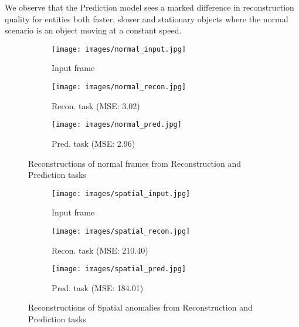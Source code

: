 \begin{itemize}
    We observe that the Prediction model sees a marked difference in reconstruction quality for entities both faster, slower and stationary objects where the normal scenario is an object moving at a constant speed. 
    \begin{figure}[h]
     \centering
     \begin{subfigure}[b]{0.3\textwidth}
         \centering
         \texttt{[image: images/normal\_input.jpg]}
         \caption{Input frame}
         \label{fig:norm-ip}
     \end{subfigure}
     \hfill
     \begin{subfigure}[b]{0.3\textwidth}
         \centering
         \texttt{[image: images/normal\_recon.jpg]}
         \caption{Recon. task (MSE: 3.02)}
         \label{fig:norm-recon}
     \end{subfigure}
     \hfill
     \begin{subfigure}[b]{0.3\textwidth}
         \centering
         \texttt{[image: images/normal\_pred.jpg]}
         \caption{Pred. task (MSE: 2.96)}
         \label{fig:norm-pred}
     \end{subfigure}
        \caption{Reconstructions of normal frames from Reconstruction and Prediction tasks}
        \label{fig:norm}
    \end{figure}
    
    \begin{figure}[h]
     \centering
     \begin{subfigure}[b]{0.3\textwidth}
         \centering
         \texttt{[image: images/spatial\_input.jpg]}
         \caption{Input frame}
         \label{fig:spat-ip}
     \end{subfigure}
     \hfill
     \begin{subfigure}[b]{0.3\textwidth}
         \centering
         \texttt{[image: images/spatial\_recon.jpg]}
         \caption{Recon. task (MSE: 210.40)}
         \label{fig:spat-recon}
     \end{subfigure}
     \hfill
     \begin{subfigure}[b]{0.3\textwidth}
         \centering
         \texttt{[image: images/spatial\_pred.jpg]}
         \caption{Pred. task (MSE: 184.01)}
         \label{fig:spat-pred}
     \end{subfigure}
        \caption{Reconstructions of Spatial anomalies from Reconstruction and Prediction tasks}
        \label{fig:spat}
    \end{figure}
    

\end{itemize}
